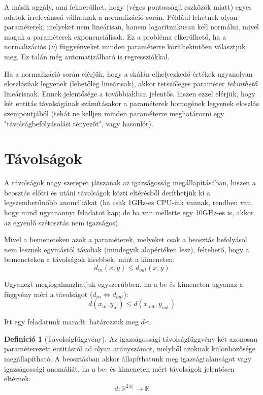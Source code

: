 \documentclass{article}
\theoremstyle{definition}
\newtheorem{definition}{Definíció}[section]
\newcommand{\subin}[1]{ {#1}_{\text{in}} }
\newcommand{\subout}[1]{ {#1}_{\text{out}} }
\begin{document}
\begin{multicols}{2}
    A másik aggály, ami felmerülhet, hogy (véges pontosságú eszközök miatt) egyes adatok irrelevánssá válhatnak a normalizáció során. Például lehetnek olyan paraméterek, melyeket nem lineárisan, hanem logaritmikusan kell normálni, mivel maguk a paraméterek exponenciálisak. Ez a probléma elkerülhető, ha a normalizációs ($\nu$) függvényeket minden paraméterre körültekintően választjuk meg. Ez talán még automatizálható is regressziókkal.
    
    Ha a normalizáció során elérjük, hogy a skálán elhelyezkedő értékek ugyanolyan eloszlásúak legyenek (lehetőleg lineárisak), akkor tetszőleges paraméter {\it tekinthető} lineárisnak. Ennek jelentősége a továbbiakban jelentős, hiszen ezzel elérjük, hogy két entitás távolságának számításakor a paraméterek homogének legyenek eloszlás szempontjából (tehát ne kelljen minden paraméterre meghatározni egy "távolságbefolyásolási tényezőt", vagy hasonlót).
    
\section{Távolságok}    
    
    A távolságok nagy szerepet játszanak az igazságosság megállapításában, hiszen a beosztás előtti és utáni távolságok közti eltérésből deríthetjük ki a legszembetűnőbb anomáliákat (ha csak 1GHz-es CPU-ink vannak, rendben van, hogy mind ugyanannyi feladatot kap; de ha van mellette egy 10GHz-es is, akkor az egyenlő szétosztás nem igazságos).
    
    Mivel a bemeneteken azok a paraméterek, melyeket csak a beosztás befolyásol nem lesznek egymástól távoliak (mindegyik alapértéken lesz), feltehető, hogy a bemeneteken a távolságok kisebbek, mint a kimeneten:
    $$ d_{in}(x, y) \leq d_{out}(x, y) $$
    
    Ugyanezt megfogalmazhatjuk egyszerűbben, ha a be és kimeneten ugyanaz a függvény méri a távolságot ($d_{in} \Longleftrightarrow d_{out}$):
    \begin{equation}
        d(\subin{x}, \subin{y}) \leq d(\subout{x}, \subout{y})
    \end{equation}
    
    Itt egy feladatunk maradt: határozzuk meg $d$-t.
    
    \begin{definition}[Távolságfüggvény]
        Az igazságossági távolságfüggvény két azonosan paraméterezett entitásról ad olyan arányszámot, melyből azoknak különbözősége megállapítható. A beosztásban akkor állapíthatunk meg igazságtalanságot vagy igazságossági anomáliát, ha a be- és kimeneten mért távolságok jelentősen eltérnek.
        \begin{equation}
            d: \mathbb{R}^{2|e|} \to \mathbb{R}
        \end{equation}
    \end{definition}
    

\end{multicols}
\end{document}
